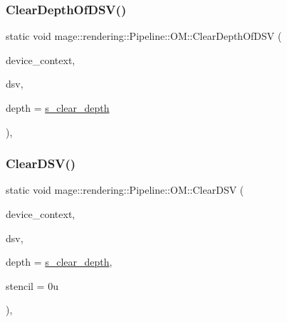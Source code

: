 \subsubsection{\texorpdfstring{Clear\+Depth\+Of\+D\+S\+V()}{ClearDepthOfDSV()}}
{\footnotesize\ttfamily static void mage\+::rendering\+::\+Pipeline\+::\+O\+M\+::\+Clear\+Depth\+Of\+D\+SV (\begin{DoxyParamCaption}\item[{I\+D3\+D11\+Device\+Context \&}]{device\+\_\+context,  }\item[{I\+D3\+D11\+Depth\+Stencil\+View $\ast$}]{dsv,  }\item[{\mbox{\hyperlink{namespacemage_aa97e833b45f06d60a0a9c4fc22ae02c0}{F32}}}]{depth = {\ttfamily \mbox{\hyperlink{structmage_1_1rendering_1_1_pipeline_1_1_o_m_a9eb4fec4852a3ca2e588a90818a706ec}{s\+\_\+clear\+\_\+depth}}} }\end{DoxyParamCaption})\hspace{0.3cm}{\ttfamily [static]}, {\ttfamily [noexcept]}}

\mbox{\label{structmage_1_1rendering_1_1_pipeline_1_1_o_m_ac25264c6f064940f886e86ec9d5fedd4}} 
\subsubsection{\texorpdfstring{Clear\+D\+S\+V()}{ClearDSV()}}
{\footnotesize\ttfamily static void mage\+::rendering\+::\+Pipeline\+::\+O\+M\+::\+Clear\+D\+SV (\begin{DoxyParamCaption}\item[{I\+D3\+D11\+Device\+Context \&}]{device\+\_\+context,  }\item[{I\+D3\+D11\+Depth\+Stencil\+View $\ast$}]{dsv,  }\item[{\mbox{\hyperlink{namespacemage_aa97e833b45f06d60a0a9c4fc22ae02c0}{F32}}}]{depth = {\ttfamily \mbox{\hyperlink{structmage_1_1rendering_1_1_pipeline_1_1_o_m_a9eb4fec4852a3ca2e588a90818a706ec}{s\+\_\+clear\+\_\+depth}}},  }\item[{\mbox{\hyperlink{namespacemage_a30677c03d683c4c35630c25f6ff3fb7f}{U8}}}]{stencil = {\ttfamily 0u} }\end{DoxyParamCaption})\hspace{0.3cm}{\ttfamily [static]}, {\ttfamily [noexcept]}}

